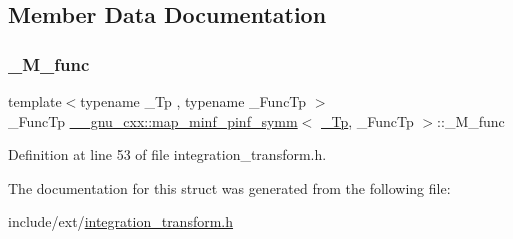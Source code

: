 \subsection{Member Data Documentation}
\mbox{\label{struct____gnu__cxx_1_1map__minf__pinf__symm_a3e6d1d72fb8471f11573dc8b6ce835c6}} 
\subsubsection{\texorpdfstring{\+\_\+\+M\+\_\+func}{\_M\_func}}
{\footnotesize\ttfamily template$<$typename \+\_\+\+Tp , typename \+\_\+\+Func\+Tp $>$ \\
\+\_\+\+Func\+Tp \hyperlink{struct____gnu__cxx_1_1map__minf__pinf__symm}{\+\_\+\+\_\+gnu\+\_\+cxx\+::map\+\_\+minf\+\_\+pinf\+\_\+symm}$<$ \hyperlink{namespace____gnu__cxx_a3b19a9c800ca194374ef9172290f7d79}{\+\_\+\+Tp}, \+\_\+\+Func\+Tp $>$\+::\+\_\+\+M\+\_\+func}



Definition at line 53 of file integration\+\_\+transform.\+h.



The documentation for this struct was generated from the following file\+:\begin{DoxyCompactItemize}
\item 
include/ext/\hyperlink{integration__transform_8h}{integration\+\_\+transform.\+h}\end{DoxyCompactItemize}
